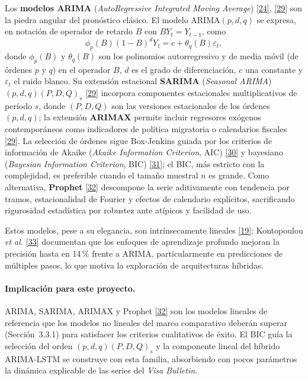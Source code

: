 \documentclass[12pt,letterpaper]{report}
\newcommand{\cita}[1]{\hyperref[bib:#1]{[#1]}}
\begin{document}
Los \textbf{modelos ARIMA} (\textit{AutoRegressive Integrated Moving Average}) \cita{24}, \cita{29} son la piedra angular del pronóstico clásico. El modelo ARIMA$(p,d,q)$ se expresa, en notación de operador de retardo $B$ con $BY_t = Y_{t-1}$, como
\begin{equation}
    \phi_p(B)(1-B)^d Y_t = c + \theta_q(B)\varepsilon_t,
\end{equation}
donde $\phi_p(B)$ y $\theta_q(B)$ son los polinomios autorregresivo y de media móvil (de órdenes $p$ y $q$) en el operador $B$, $d$ es el grado de diferenciación, $c$ una constante y $\varepsilon_t$ el ruido blanco. Su extensión estacional \textbf{SARIMA} (\textit{Seasonal ARIMA}) $(p,d,q)(P,D,Q)_s$ \cita{29} incorpora componentes estacionales multiplicativos de período $s$, donde $(P, D, Q)$ son las versiones estacionales de los órdenes $(p, d, q)$; la extensión \textbf{ARIMAX} permite incluir regresores exógenos contemporáneos como indicadores de política migratoria o calendarios fiscales \cita{29}. La selección de órdenes sigue Box-Jenkins guiada por los criterios de información de Akaike (\textit{Akaike Information Criterion}, AIC) \cita{30} y bayesiano (\textit{Bayesian Information Criterion}, BIC) \cita{31}; el BIC, más estricto con la complejidad, es preferible cuando el tamaño muestral $n$ es grande. Como alternativa, \textbf{Prophet} \cita{32} descompone la serie aditivamente con tendencia por tramos, estacionalidad de Fourier y efectos de calendario explícitos, sacrificando rigurosidad estadística por robustez ante atípicos y facilidad de uso.

Estos modelos, pese a su elegancia, son intrínsecamente lineales \cita{19}; Kontopoulou \textit{et al.} \cita{33} documentan que los enfoques de aprendizaje profundo mejoran la precisión hasta en 14\,\% frente a ARIMA, particularmente en predicciones de múltiples pasos, lo que motiva la exploración de arquitecturas híbridas.

\paragraph{Implicación para este proyecto.} ARIMA, SARIMA, ARIMAX y Prophet \cita{32} son los modelos lineales de referencia que los modelos no lineales del marco comparativo deberán superar (Sección~3.3.1) para satisfacer los criterios cualitativos de éxito. El BIC guía la selección del orden $(p,d,q)(P,D,Q)_s$ y la componente lineal del híbrido ARIMA-LSTM se construye con esta familia, absorbiendo con pocos parámetros la dinámica explicable de las series del \textit{Visa Bulletin}.
\end{document}
